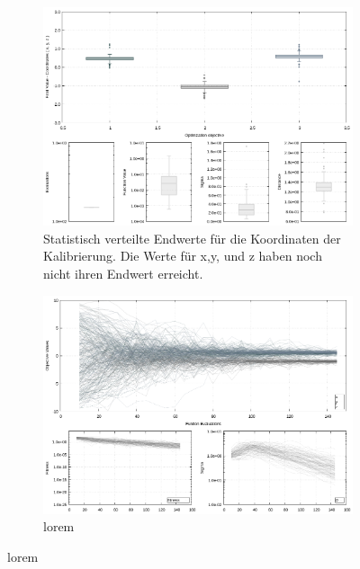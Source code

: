 \begin{figure}[h]
         \centering
         \begin{subfigure}[h]{0.4\textwidth}
                 \centering
                 \includegraphics[width=\textwidth]{img/calibration/aborted_calibration_ant0-boxes.png}
                 \caption{Statistisch verteilte Endwerte für die Koordinaten der Kalibrierung. Die Werte für x,y, und z haben noch nicht ihren Endwert erreicht.}
                 \label{fig:abortedFinal_Calibration_Ant0_ES-boxes}
         \end{subfigure}
%
\qquad         
%
         \begin{subfigure}[h]{0.4\textwidth}
                 \centering
                 \includegraphics[width=\textwidth]{img/calibration/aborted_calibration_ant0-lines.png}
                 \caption{lorem}

\end{subfigure}
\end{figure}
